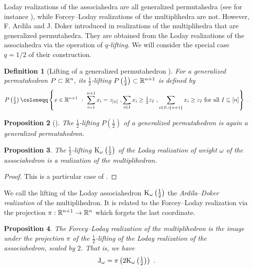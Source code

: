 \documentclass[twoside, 12pt]{amsart}
\newtheorem{definition}{Definition}[section]
\newtheorem{proposition}[definition]{Proposition}
\theoremstyle{remark}
\begin{document}
Loday realizations of the associahedra are all generalized permutahedra (see for instance \cite[Corollary 2.16]{LA21}), while Forcey--Loday realizations of the multiplihedra are not. 
However, F. Ardila and J. Doker introduced in \cite{AD13} realizations of the multiplihedra that are generalized permutahedra. 
They are obtained from the Loday realizations of the associahedra via the operation of \emph{$q$-lifting}. 
We will consider the special case $q=1/2$ of their construction.

\begin{definition}[Lifting of a generalized permutahedron {\cite[Definition 2.3]{AD13}}]
For a generalized permutahedron $P\subset \mathbb{R}^n$, its \emph{$\tfrac{1}{2}$-lifting} $P \left(\tfrac{1}{2}\right) \subset \mathbb{R}^{n+1}$ is defined by 
\[P \left(\tfrac{1}{2}\right) \coloneqq \left\{ x \in \RR^{n+1} \ : \ 
\sum_{i=1}^{n+1} x_i = z_{[n]} \ , 
\sum_{i \in I} x_i \geq \tfrac{1}{2}z_I \ ,
\sum_{i \in I \cup \{n+1\}} x_i \geq z_I 
\text{ for all } I \subseteq [n] \right\} \ . \]
\end{definition}

\begin{proposition}[{\cite[Proposition 2.4]{AD13}}] 
The $\tfrac{1}{2}$-lifting $P \left(\tfrac{1}{2}\right)$ of a generalized permutahedron is again a generalized permutahedron. 
\end{proposition}

\begin{proposition} 
The $\tfrac{1}{2}$-lifting $\mathrm{K}_\omega\left(\tfrac{1}{2}\right)$ of the Loday realization of weight $\omega$ of the associahedron is a realization of the multiplihedron. 
\end{proposition}
\begin{proof} 
This is a particular case of \cite[Corollary 4.10]{AD13}.
\end{proof}

We call the lifting of the Loday associahedron $\mathrm{K}_\omega\left(\tfrac{1}{2}\right)$ the\emph{ Ardila--Doker realization} of the multiplihedron. It is related to the Forcey--Loday realization via the projection $\pi: \mathbb{R}^{n+1} \to \mathbb{R}^n$ which forgets the last coordinate. 
 
\begin{proposition} 
\label{prop:lifting} 
The Forcey--Loday realization of the multiplihedron is the image under the projection $\pi$ of the $\tfrac{1}{2}$-lifting of the Loday realization of the associahedron, scaled by $2$. 
That is, we have  \[ \mathrm{J}_\omega = \pi \left(2 \mathrm{K}_\omega\left(\tfrac{1}{2}\right)\right) \ . \]
\end{proposition}
\end{document}
